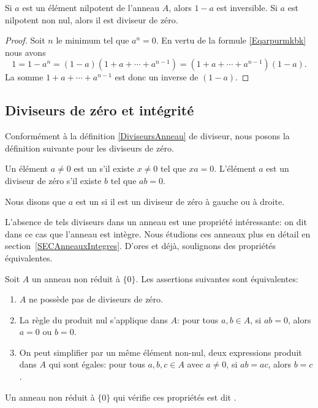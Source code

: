 \begin{proposition}
    Si \( a\) est un élément nilpotent de l'anneau \( A\), alors \( 1-a\) est inversible. Si \( a\) est nilpotent non nul, alors il est diviseur de zéro.
\end{proposition}

\begin{proof}
    Soit \( n\) le minimum tel que \( a^n=0\). En vertu de la formule \eqref{Eqarpurmkbk} nous avons
    \begin{equation}
        1=1-a^n=(1-a)(1+a+\cdots+a^{n-1})=(1+a+\cdots+a^{n-1})(1-a).
    \end{equation}
    La somme \( 1+a+\cdots+a^{n-1}\) est donc un inverse de \( (1-a)\).
\end{proof}


\subsection{Diviseurs de zéro et intégrité}

Conformément à la définition \ref{DiviseursAnneau} de diviseur, nous posons la définition suivante pour les diviseurs de zéro.
\begin{definition}
    Un élément \( a\neq 0\) est un  s'il existe \( x\neq 0\) tel que $xa=0$. L'élément \( a\) est un diviseur de zéro  s'il existe \( b\) tel que \( ab=0\).

    Nous disons que \( a\) est un  si il est un diviseur de zéro à gauche ou à droite.
\end{definition}

L'absence de tels diviseurs dans un anneau est une propriété intéressante: on dit dans ce cas que l'anneau est intègre. Nous étudions ces anneaux plus en détail en section~\ref{SECAnneauxIntegres}. D'ores et déjà, soulignons des propriétés équivalentes.

\begin{propositionDef}           \label{DEFooTAOPooWDPYmd}
    Soit $A$ un anneau non réduit à \( \{ 0 \}\). Les assertions suivantes sont équivalentes:
    \begin{enumerate}
        \item       \label{ITEMooMXMKooXMYpkN}
            \( A\) ne possède pas de diviseurs de zéro.
        \item       \label{ITEMooLAJCooFwxXrV}
            La règle du produit nul s'applique dans $A$: pour tous \( a, b \in A \), si \( ab=0\), alors \( a = 0\) ou \( b = 0\).
        \item       \label{ITEMooQNTFooSRrVPK}
            On peut simplifier par un même élément non-nul, deux expressions produit dans $A$ qui sont égales: pour tous \( a, b, c \in A \) avec \( a \neq 0 \), si \( ab = ac \), alors \( b = c \).
    \end{enumerate}
    Un anneau non réduit à \( \{ 0 \}\) qui vérifie ces propriétés est dit .
\end{propositionDef}

